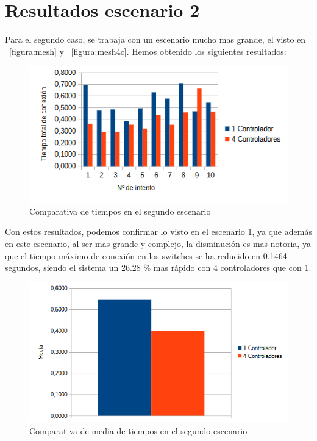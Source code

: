 \documentclass[a4paper, 12pt]{book}
\begin{document}
 	\section{Resultados escenario 2} 
 	\label{sec:resultEsc2}
 	
 	
 	Para el segundo caso, se trabaja con un escenario mucho mas grande, el visto en ~\ref{figura:mesh} y ~\ref{figura:mesh4c}. Hemos obtenido los siguientes resultados:
 	
 	\begin{figure}[H]
 		\centering
 		\includegraphics[width=16cm, keepaspectratio]{img/comparativamesh}
 		\caption{Comparativa de tiempos en el segundo escenario}
 		\label{figura:comparativamesh}
 	\end{figure}
 	
 	Con estos resultados, podemos confirmar lo visto en el escenario 1, ya que además en este escenario, al ser mas grande y complejo, la disminución es mas notoria, ya que el tiempo máximo de conexión en los switches se ha reducido en 0.1464 segundos, siendo el sistema un 26.28 \% mas rápido con 4 controladores que con 1.
 	
 	\begin{figure}[H]
 		\centering
 		\includegraphics[width=12cm, keepaspectratio]{img/comparativamediamesh}
 		\caption{Comparativa de media de tiempos en el segundo escenario}
 		\label{figura:mediamesh}
 	\end{figure}
 	
\end{document}
